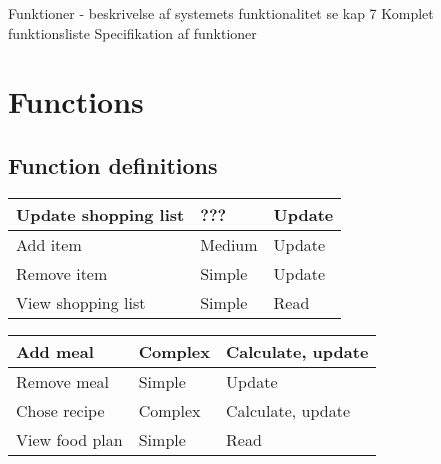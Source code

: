Funktioner - beskrivelse af systemets funktionalitet se kap 7
	Komplet funktionsliste
	Specifikation af funktioner
	
	\chapter{Functions}
	
	\section{Function definitions}
	\begin{tabular}{|l|l|l|}\hline
	  Update shopping list  &  ???     & Update \\\hline
	  Add item              &  Medium  & Update \\\hline
	  Remove item           &  Simple  & Update \\\hline
	  View shopping list    &  Simple  & Read   \\\hline
	\end{tabular}
	
	\begin{tabular}{|l|l|l|}\hline
	  Add meal              &  Complex & Calculate, update \\\hline
	  Remove meal           &  Simple  & Update            \\\hline
	  Chose recipe          &  Complex & Calculate, update \\\hline
	  View food plan        &  Simple  & Read              \\\hline
	\end{tabular}
	